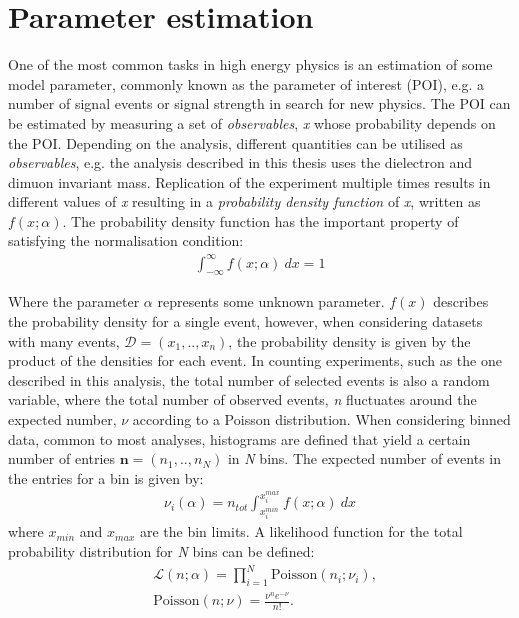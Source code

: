 \section{Parameter estimation}
One of the most common tasks in high energy physics is an estimation of some model parameter, commonly known as the parameter of interest (POI), e.g. a number of signal events or signal strength in search for new physics. The POI can be estimated by measuring a set of \emph{observables}, \emph{x} whose probability depends on the POI. Depending on the analysis, different quantities can be utilised as \emph{observables}, e.g. the analysis described in this thesis uses the dielectron and dimuon invariant mass. Replication of the experiment multiple times results in different values of \emph{x} resulting in a \emph{probability density function} of \emph{x}, written as $f(x;\alpha)$. The probability density function has the important property of satisfying the normalisation condition:
\begin{equation}
    \begin{aligned}
        \int_{-\infty}^{\infty} f(x;\alpha)~dx = 1
    \end{aligned}
\end{equation}

Where the parameter $\alpha$ represents some unknown parameter. $f(x)$ describes the probability density for a single event, however, when considering datasets with many events, $\mathcal{D} = (x_1,..,x_n)$, the probability density is given by the product of the densities for each event. In counting experiments, such as the one described in this analysis, the total number of selected events is also a random variable, where the total number of observed events, \emph{n} fluctuates around the expected number, $\nu$ according to a Poisson distribution. When considering binned data, common to most analyses, histograms are defined that yield a certain number of entries $\textbf{n} = (n_1,..,n_N)$ in \emph{N} bins. The expected number of events in the entries for a bin is given by:
\begin{equation}
\begin{aligned}
    \nu_i(\alpha) = n_{tot}\int_{x_i^{min}}^{x_i^{max}} f(x;\alpha)~dx
\end{aligned}
\end{equation}
where $x_{min}$ and $x_{max}$ are the bin limits. A likelihood function for the total probability distribution for \emph{N} bins can be defined:
\begin{equation}
    \label{eq:poissL}
    \begin{aligned}
        & \mathcal{L}(n;\alpha) = \prod_{i=1}^{N}\mathrm{Poisson}(n_i;\nu_i), \\
        & \mathrm{Poisson}(n;\nu) = \frac{\nu^ne^{-\nu}}{n!}.
    \end{aligned}
\end{equation}

